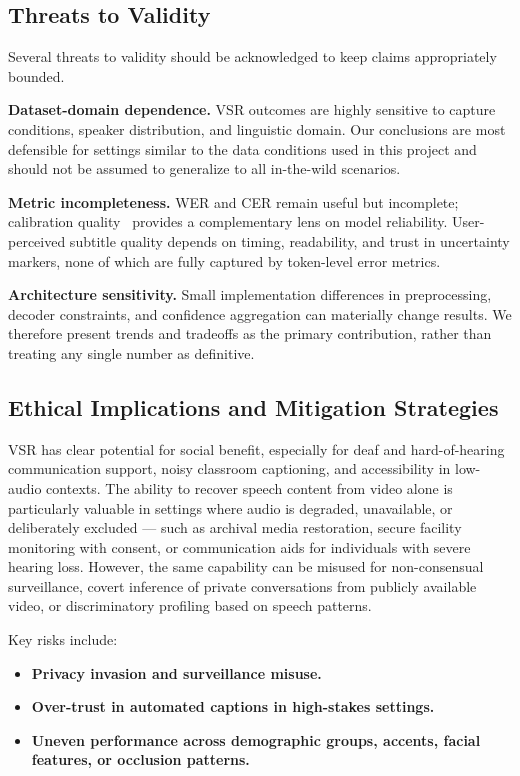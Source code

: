 \documentclass[10pt,twocolumn,letterpaper]{article}
\begin{document}
\subsection{Threats to Validity}
Several threats to validity should be acknowledged to keep claims appropriately bounded.

\textbf{Dataset-domain dependence.}
VSR outcomes are highly sensitive to capture conditions, speaker distribution, and linguistic domain. Our conclusions are most defensible for settings similar to the data conditions used in this project and should not be assumed to generalize to all in-the-wild scenarios.

\textbf{Metric incompleteness.}
WER and CER remain useful but incomplete; calibration quality~\cite{guo2017calibration} provides a complementary lens on model reliability. User-perceived subtitle quality depends on timing, readability, and trust in uncertainty markers, none of which are fully captured by token-level error metrics.

\textbf{Architecture sensitivity.}
Small implementation differences in preprocessing, decoder constraints, and confidence aggregation can materially change results. We therefore present trends and tradeoffs as the primary contribution, rather than treating any single number as definitive.

\subsection{Ethical Implications and Mitigation Strategies}
VSR has clear potential for social benefit, especially for deaf and hard-of-hearing communication support, noisy classroom captioning, and accessibility in low-audio contexts. The ability to recover speech content from video alone is particularly valuable in settings where audio is degraded, unavailable, or deliberately excluded — such as archival media restoration, secure facility monitoring with consent, or communication aids for individuals with severe hearing loss. However, the same capability can be misused for non-consensual surveillance, covert inference of private conversations from publicly available video, or discriminatory profiling based on speech patterns.

Key risks include:
\begin{itemize}[leftmargin=*]
    \item \textbf{Privacy invasion and surveillance misuse.}
    \item \textbf{Over-trust in automated captions in high-stakes settings.}
    \item \textbf{Uneven performance across demographic groups, accents, facial features, or occlusion patterns.}
\end{itemize}
\end{document}
